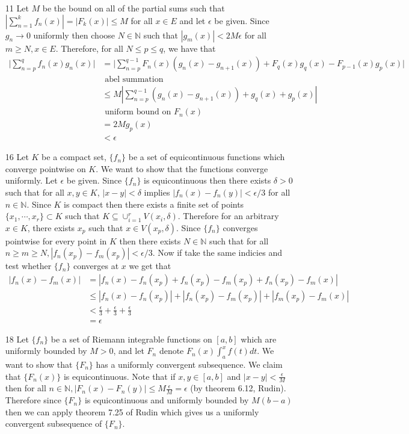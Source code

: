 \documentclass[12pt, letterpaper]{article}
\newcommand{\N}{\mathbb{N}}
\begin{document}
\begin{enumerate}
	\item[11] Let $M$ be the bound on all of the partial sums such that $|\sum_{n=1}^k f_n(x)| = |F_k(x)| \leq M$ for all $x \in E$ and let $\epsilon$ be
	given.  Since $g_n \to 0$ uniformly then choose $N \in \N$ such that $|g_m(x)| < 2M \epsilon$ for all $m \geq N, x \in E$.  Therefore, for all $N \leq p \leq q$, 
	we have that 
	\begin{align*}
		\lvert \sum_{n = p}^q f_n(x) g_n(x) \rvert &= 
		\lvert \sum_{n=p}^{q-1} F_n(x) (g_n(x) - g_{n+1}(x)) + F_q(x) g_q (x) - F_{p-1}(x) g_p(x)  \rvert\\ & \text{ abel summation}\\
		&\leq M|\sum_{n=p}^{q-1} (g_n(x) - g_{n+1}(x)) + g_q(x) + g_p(x)|\\ 
		&\text{ uniform bound on } F_n(x)\\ 
		&= 2Mg_p(x)\\
		&< \epsilon
	\end{align*}
	\item[16] Let $K$ be a compact set, $\{f_n\}$ be a set of equicontinuous 
	functions which converge pointwise on $K$.  We want to show that the functions
	converge uniformly.  Let $\epsilon$ be given.  Since $\{f_n\}$ is 
	equicontinuous then there exists $\delta > 0$ such that for all $x,y \in K$,
	$|x-y| < \delta$ implies $|f_n(x) - f_n(y)| < \epsilon/3$ for all $n \in \N$.  
	Since $K$ is compact then there exists a finite set of points 
	$\{x_1,\cdots, x_r\} \subset K$ such that 
	$K \subseteq \cup_{i=1}^r V(x_i,\delta)$.  Therefore for an arbitrary $x\in K$,
	there exists $x_p$ such that $x \in V(x_p,\delta)$.  Since $\{f_n\}$ converges
	pointwise for every point in $K$ then there exists $N \in \N$ such that for 
	all $n \geq m \geq N, |f_n(x_p) - f_m(x_p)| < \epsilon/3$.  Now if take the 
	same indicies and test whether $\{f_n\}$ converges at $x$ we get that
	\begin{align*}
		|f_n(x) - f_m(x)| &= |f_n(x) -f_n(x_p) + f_n(x_p) - f_m(x_p) + f_n(x_p) - f_m(x)|\\
		&\leq |f_n(x) -f_n(x_p)| + |f_n(x_p) - f_m(x_p)| + |f_m(x_p) - f_m(x)|\\
		&< \frac{\epsilon}{3} + \frac{\epsilon}{3} + \frac{\epsilon}{3}\\
		&= \epsilon
	\end{align*}
	\item[18] Let $\{f_n\}$ be a set of Riemann integrable functions on $[a,b]$ 
	which are uniformly bounded by $M > 0$, and let $F_n$ denote $F_n(x) \int_a^x f(t) dt$.  We want to show that $\{F_n\}$ has a uniformly convergent subsequence.
	We claim that $\{F_n(x)\}$ is equicontinuous.  Note that if $x,y \in [a,b]$
	and $|x-y| < \frac{\epsilon}{M}$ then for all 
	$n \in \N,|F_n(x) - F_n(y)| \leq M \frac{\epsilon}{M} = \epsilon $ 
	(by theorem 6.12, Rudin).  Therefore since $\{F_n\}$ is equicontinuous and 
	uniformly bounded by $M(b-a)$ then we can apply theorem 7.25 of Rudin which 
	gives us a uniformly convergent subsequence of $\{F_n\}$.  
\end{enumerate}
\end{document}
